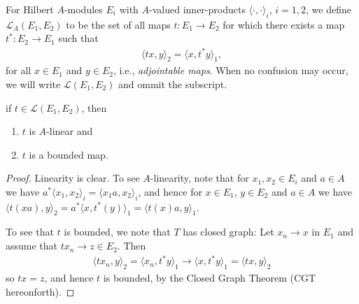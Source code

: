 \begin{definition}
	For Hilbert $A$-modules $E_i$ with $A$-valued inner-products $\langle \cdot , \cdot\rangle_i$, $i=1,2$, we define $\mathcal{L}_A(E_1,E_2)$ to be the set of all maps $t \colon E_1 \to E_2$ for which there exists a map $t^* \colon E_2 \to E_1$ such that
	\begin{align*}
		\langle tx, y \rangle_2 = \langle x , t^*y \rangle_1,
	\end{align*}
	for all $x \in E_1$ and $y \in E_2$, i.e., \emph{adjointable maps}. When no confusion may occur, we will write $\mathcal{L}(E_1,E_2)$ and ommit the subscript.
\end{definition}
\begin{proposition}
	if $t \in \mathcal{L}(E_1,E_2)$, then
\begin{enumerate}
	\item $t$ is $A$-linear and\\
	\item $t$ is a bounded map.
\end{enumerate}
\end{proposition}
\begin{proof}
	Linearity is clear. To see $A$-linearity, note that for $x_1,x_2 \in E_i$ and $a \in A$ we have $a^* \langle x_1,x_2\rangle_i = \langle x_1 a , x_2\rangle_i$, and hence for $x \in E_1$, $y \in E_2$ and $a \in A$ we have $\langle t(xa) , y \rangle_2 = a^* \langle x,t^*(y)\rangle_1 = \langle t(x)a,y\rangle_1$.

	To see that $t$ is bounded, we note that $T$ has closed graph: Let $x_n \to x$ in $E_1$ and assume that $tx_n \to z \in E_2$. Then
	\begin{align*}
		\langle tx_n , y\rangle_2  = \langle x_n, t^*y\rangle_1 \to \langle x, t^*y \rangle_1 = \langle tx,y\rangle_2
	\end{align*}
	so $tx = z$, and hence $t$ is bounded, by the Closed Graph Theorem (CGT hereonforth).
\end{proof}

